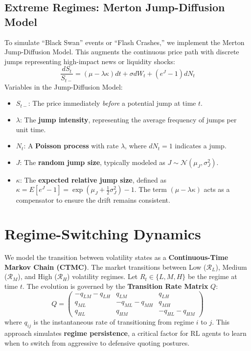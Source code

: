 \subsection{Extreme Regimes: Merton Jump-Diffusion Model}
To simulate ``Black Swan'' events or ``Flash Crashes,'' we implement the Merton Jump-Diffusion Model. This augments the continuous price path with discrete jumps representing high-impact news or liquidity shocks:
\begin{equation}
    \frac{dS_t}{S_{t-}} = (\mu - \lambda \kappa) dt + \sigma dW_t + (e^J - 1) dN_t
\end{equation}
Variables in the Jump-Diffusion Model:
\begin{itemize}
    \item $S_{t-}$: The price immediately \textit{before} a potential jump at time $t$.
    \item $\lambda$: The \textbf{jump intensity}, representing the average frequency of jumps per unit time.
    \item $N_t$: A \textbf{Poisson process} with rate $\lambda$, where $dN_t=1$ indicates a jump.
    \item $J$: The \textbf{random jump size}, typically modeled as $J \sim \mathcal{N}(\mu_J, \sigma_J^2)$.
    \item $\kappa$: The \textbf{expected relative jump size}, defined as $\kappa = E[e^J - 1] = \exp(\mu_J + \frac{1}{2}\sigma_J^2) - 1$. The term $(\mu - \lambda \kappa)$ acts as a compensator to ensure the drift remains consistent.
\end{itemize}

\section{Regime-Switching Dynamics}
We model the transition between volatility states as a \textbf{Continuous-Time Markov Chain (CTMC)}. The market transitions between Low ($\mathcal{R}_L$), Medium ($\mathcal{R}_M$), and High ($\mathcal{R}_H$) volatility regimes. Let $R_t \in \{L, M, H\}$ be the regime at time $t$. The evolution is governed by the \textbf{Transition Rate Matrix} $Q$:
\begin{equation}
    Q = \begin{pmatrix} 
    -q_{LM}-q_{LH} & q_{LM} & q_{LH} \\
    q_{ML} & -q_{ML}-q_{MH} & q_{MH} \\
    q_{HL} & q_{HM} & -q_{HL}-q_{HM}
    \end{pmatrix}
\end{equation}
where $q_{ij}$ is the instantaneous rate of transitioning from regime $i$ to $j$. This approach simulates \textbf{regime persistence}, a critical factor for RL agents to learn when to switch from aggressive to defensive quoting postures.

